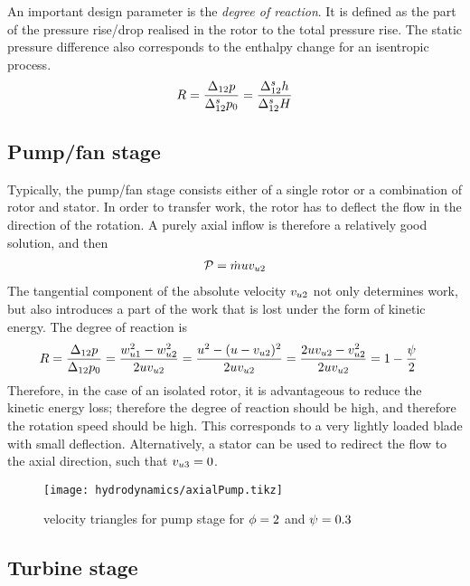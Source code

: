 An important design parameter is the \emph{degree of reaction}. It is
defined as the part of the pressure rise/drop realised in the rotor to
the total pressure rise. The static pressure difference also
corresponds to the enthalpy change for an isentropic process.
\begin{align*}
  R = 
  \frac{\Delta_{12} p}{\Delta_{12}^s p_{0}} = 
  \frac{\Delta_{12}^s h}{\Delta_{12}^s H}
\end{align*}

\subsection{Pump/fan stage} 

Typically, the pump/fan stage consists either of a single rotor or a
combination of rotor and stator. In order to transfer work, the rotor
has to deflect the flow in the direction of the rotation. A purely
axial inflow is therefore a relatively good solution, and then
\begin{align*}
  \mathcal P = \dot m u v_{u 2} 
\end{align*}
The tangential component of the absolute velocity $v_{u 2}$ not
only determines work, but also introduces a part of the work that is
lost under the form of kinetic energy. The degree of reaction is
\begin{align*}
  R 
  &= \frac{\Delta_{12} p}{\Delta_{12} p_{0}} = \frac{w_{u 1}^2 - w_{u 2}^2}{2 u v_{u 2}} 
  = \frac{u^2 - (u - v_{u 2})^2}{2 u v_{u 2}} 
  = \frac{2 u v_{u 2} - v_{u 2}^2}{2 u v_{u 2}} = 1 - \frac{\psi}{2}
\end{align*}
Therefore, in the case of an isolated rotor, it is advantageous to
reduce the kinetic energy loss; therefore the degree of reaction
should be high, and therefore the rotation speed should be high. This
corresponds to a very lightly loaded blade with small
deflection. Alternatively, a stator can be used to redirect the flow
to the axial direction, such that $v_{u 3} = 0$.
\begin{figure}[!h]
  \centering
  \texttt{[image: hydrodynamics/axialPump.tikz]}
  \caption{velocity triangles for pump stage for $\phi = 2$ and $\psi = 0.3$}
  \label{fig:axialPumpVelocity}
\end{figure}

\subsection{Turbine stage} 



